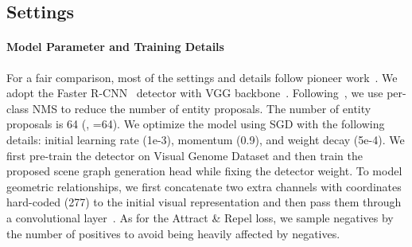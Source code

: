     \subsection{Settings}
    \label{section:setting}
        \paragraph{Model Parameter and Training Details}
            For a fair comparison, most of the settings and details follow pioneer work~\cite{xu2017scene, zellers2018neural}.
            We adopt the Faster R-CNN~\cite{ren2015faster} detector with VGG backbone~\cite{simonyan2014very}.
            Following~\cite{zellers2018neural}, we use per-class NMS to reduce the number of entity proposals. The number of entity proposals is 64 (\ie, =64).
            We optimize the model using SGD with the following details: initial learning rate (1e-3), momentum (0.9), and weight decay (5e-4).
            We first pre-train the detector on Visual Genome Dataset and then train the proposed scene graph generation head while fixing the detector weight.
            To model geometric relationships, we first concatenate two extra channels with coordinates hard-coded (277) to the initial visual representation and then pass them through a convolutional layer~\cite{liu2018intriguing}. As for the Attract \& Repel loss, we sample negatives by the number of positives to avoid being heavily affected by negatives.
        
